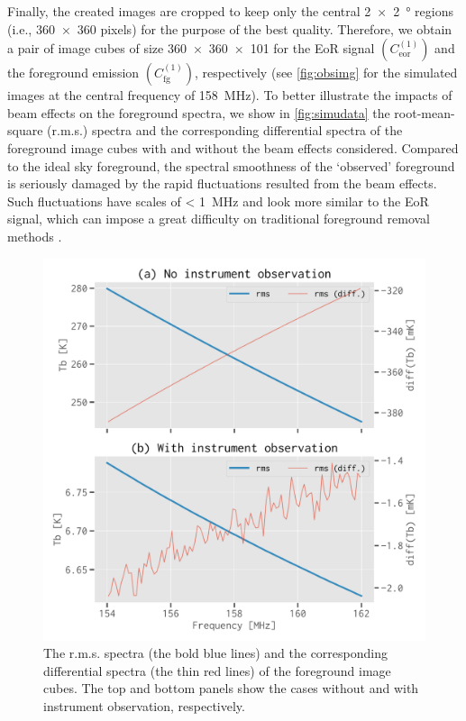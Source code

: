 \documentclass[fleqn,usenatbib]{mnras}
\newcommand{\R}[1]{\mathrm{#1}}
\newcommand{\editone}[1]{{\leavevmode\color{cyan}#1}}
\begin{document}
Finally, the created images are cropped to keep only the central
\SI{2 x 2}{\degree} regions (i.e., \num{360 x 360} pixels) for the
purpose of the best quality.
Therefore, we obtain \editone{a pair of} image cubes of size
\num{360 x 360 x 101} for the EoR signal $\left( C_{\R{eor}}^{(1)} \right)$
and the foreground emission $\left( C_{\R{fg}}^{(1)} \right)$, respectively
\editone{%
(see \autoref{fig:obsimg} for the simulated images at the central frequency
of \SI{158}{\MHz}).
To better illustrate the impacts of beam effects on the foreground spectra,
we show in \autoref{fig:simudata} the root-mean-square (r.m.s\@.) spectra
and the corresponding differential spectra of the foreground image cubes
with and without the beam effects considered.
Compared to the ideal sky foreground, the spectral smoothness of the
`observed' foreground is seriously damaged by the rapid fluctuations
resulted from the beam effects.
Such fluctuations have scales of \SI{< 1}{\MHz} and look more similar to
the EoR signal, which can impose a great difficulty on traditional
foreground removal methods \citep[e.g.,][]{liu2009ps}.
} %

\begin{figure}
  \centering
  \includegraphics[width=\columnwidth]{simudata}
  \caption{\label{fig:simudata}\editone{%
    The r.m.s\@. spectra (the bold blue lines) and the corresponding
    differential spectra (the thin red lines) of the foreground image
    cubes.} %
    The top and bottom panels show the cases without and with instrument
    observation, respectively.
  }
\end{figure}
\end{document}
